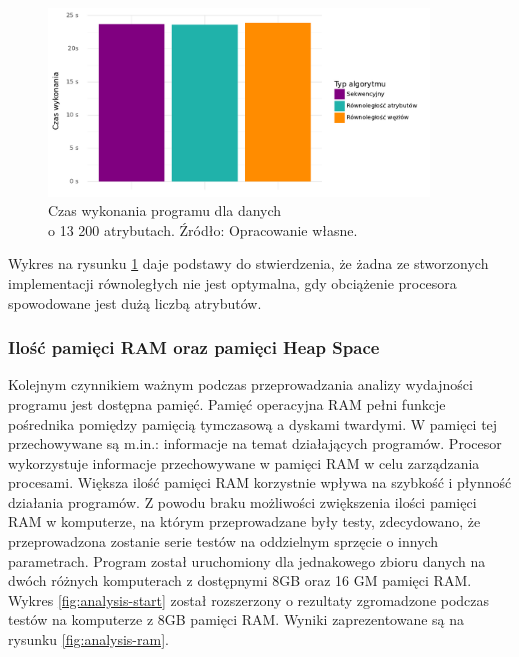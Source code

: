 \documentclass[12pt]{article}
\begin{document}
\begin{figure}[H]
    \centering
	\includegraphics[width=0.9\textwidth]{analysis-attributes-bar-plot.pdf}
    \caption{Czas wykonania programu dla danych\\ o 13 200 atrybutach. Źródło: Opracowanie własne.}
    \label{fig:analysis-attributes-bar-plot}
\end{figure}

Wykres na rysunku \ref{fig:analysis-attributes-bar-plot} daje podstawy do stwierdzenia, że żadna ze stworzonych implementacji równoległych nie jest optymalna,
gdy obciążenie procesora spowodowane jest dużą liczbą atrybutów.

\subsubsection{Ilość pamięci RAM oraz pamięci Heap Space}

Kolejnym czynnikiem ważnym podczas przeprowadzania analizy wydajności programu jest dostępna pamięć.
Pamięć operacyjna RAM pełni funkcje pośrednika pomiędzy pamięcią tymczasową a dyskami twardymi.
W pamięci tej przechowywane są m.in.: informacje na temat działających programów. Procesor wykorzystuje informacje
przechowywane w pamięci RAM w celu zarządzania procesami.
Większa ilość pamięci RAM korzystnie wpływa na szybkość i płynność działania programów. 
Z powodu braku możliwości zwiększenia ilości pamięci RAM w komputerze, na którym przeprowadzane były testy, zdecydowano, że
przeprowadzona zostanie serie testów na oddzielnym sprzęcie o innych parametrach. Program został uruchomiony
dla jednakowego zbioru danych na dwóch różnych komputerach z dostępnymi 8GB oraz 16 GM pamięci RAM.
Wykres \ref{fig:analysis-start} został rozszerzony o rezultaty zgromadzone podczas testów na komputerze z 8GB pamięci RAM.
Wyniki zaprezentowane są na rysunku \ref{fig:analysis-ram}.
\end{document}
